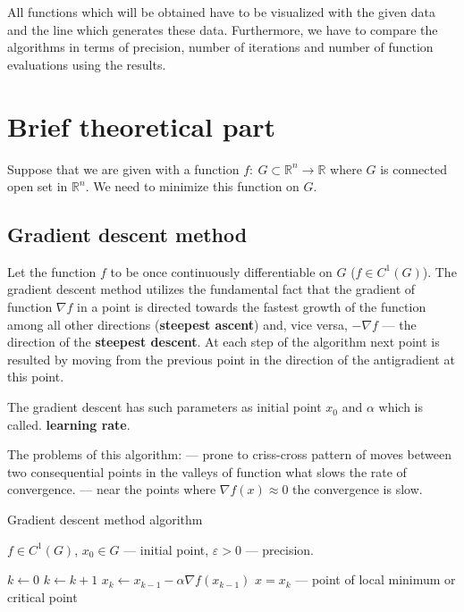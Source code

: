 \documentclass[12pt, bachelor, substylefile = algo_title.rtx]{disser}
\newcommand{\eps}{\varepsilon}
\newcommand{\Real}{\mathbb{R}}
\theoremstyle{definition}
\begin{document}
All functions which will be obtained have to be visualized with the given data and the line which generates these data. Furthermore, we have to compare the algorithms in terms of precision, number of iterations and number of function evaluations using the results.

\section{Brief theoretical part}

Suppose that we are given with a function $f:\ G \subset \Real^n \to \Real$ where $G$ is connected open set in $\Real^n$. We need to minimize this function on $G$.

\subsection{Gradient descent method}
Let the function $f$ to be once continuously differentiable on $G$ ($f \in C^1(G)$). The gradient descent method utilizes the fundamental fact that the gradient of function $\nabla f$ in a point is directed towards the fastest growth of the function among all other directions (\textbf{steepest ascent}) and, vice versa, $-\nabla f$ --- the direction of the \textbf{steepest descent}. At each step of the algorithm next point is resulted by moving from the previous point in the direction of the antigradient at this point. 

The gradient descent has such parameters as initial point $x_0$ and $\alpha$ which is called. \textbf{learning rate}.

The problems of this algorithm: 
--- prone to criss-cross pattern of moves between two consequential points in the valleys of function what slows the rate of convergence.
--- near the points where $\nabla f(x) \approx 0$ the convergence is slow.

\begin{algorithm}[h]
\caption{Gradient descent method algorithm}
\label{alg: graddesc}
\begin{algorithmic}

\Require $f \in C^1(G)$, $x_0 \in G$ --- initial point, $\eps>0$ --- precision. 

\State $k \gets 0$
\While{$\|x_k - x_{k-1}\| > \eps$}
\State $k \gets k+1$
\State $x_k \gets x_{k-1} - \alpha \nabla f(x_{k-1})$
\EndWhile
\Ensure $\widehat{x} = x_k$ --- point of local minimum or critical point
\end{algorithmic}
\end{algorithm}
\end{document}
